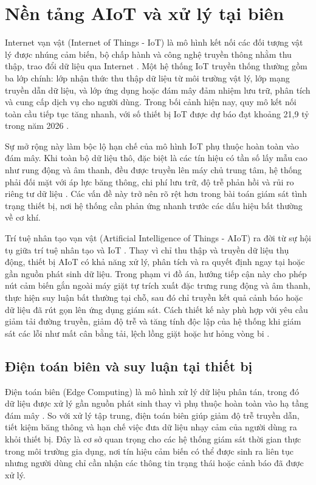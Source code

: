 \section{Nền tảng AIoT và xử lý tại biên}

Internet vạn vật (Internet of Things - IoT) là mô hình kết nối các đối tượng vật lý được nhúng cảm biến, bộ chấp hành và công nghệ truyền thông nhằm thu thập, trao đổi dữ liệu qua Internet . Một hệ thống IoT truyền thống thường gồm ba lớp chính: lớp nhận thức thu thập dữ liệu từ môi trường vật lý, lớp mạng truyền dẫn dữ liệu, và lớp ứng dụng hoặc đám mây đảm nhiệm lưu trữ, phân tích và cung cấp dịch vụ cho người dùng. Trong bối cảnh hiện nay, quy mô kết nối toàn cầu tiếp tục tăng nhanh, với số thiết bị IoT được dự báo đạt khoảng 21,9 tỷ trong năm 2026 .

Sự mở rộng này làm bộc lộ hạn chế của mô hình IoT phụ thuộc hoàn toàn vào đám mây. Khi toàn bộ dữ liệu thô, đặc biệt là các tín hiệu có tần số lấy mẫu cao như rung động và âm thanh, đều được truyền lên máy chủ trung tâm, hệ thống phải đối mặt với áp lực băng thông, chi phí lưu trữ, độ trễ phản hồi và rủi ro riêng tư dữ liệu \cite{ref_1_4}. Các vấn đề này trở nên rõ rệt hơn trong bài toán giám sát tình trạng thiết bị, nơi hệ thống cần phản ứng nhanh trước các dấu hiệu bất thường về cơ khí.

Trí tuệ nhân tạo vạn vật (Artificial Intelligence of Things - AIoT) ra đời từ sự hội tụ giữa trí tuệ nhân tạo và IoT . Thay vì chỉ thu thập và truyền dữ liệu thụ động, thiết bị AIoT có khả năng xử lý, phân tích và ra quyết định ngay tại hoặc gần nguồn phát sinh dữ liệu. Trong phạm vi đồ án, hướng tiếp cận này cho phép nút cảm biến gắn ngoài máy giặt tự trích xuất đặc trưng rung động và âm thanh, thực hiện suy luận bất thường tại chỗ, sau đó chỉ truyền kết quả cảnh báo hoặc dữ liệu đã rút gọn lên ứng dụng giám sát. Cách thiết kế này phù hợp với yêu cầu giảm tải đường truyền, giảm độ trễ và tăng tính độc lập của hệ thống khi giám sát các lỗi như mất cân bằng tải, lệch lồng giặt hoặc hư hỏng vòng bi \cite{ref_1_3}.

\subsection{Điện toán biên và suy luận tại thiết bị}

Điện toán biên (Edge Computing) là mô hình xử lý dữ liệu phân tán, trong đó dữ liệu được xử lý gần nguồn phát sinh thay vì phụ thuộc hoàn toàn vào hạ tầng đám mây \cite{ref_1_4}. So với xử lý tập trung, điện toán biên giúp giảm độ trễ truyền dẫn, tiết kiệm băng thông và hạn chế việc đưa dữ liệu nhạy cảm của người dùng ra khỏi thiết bị. Đây là cơ sở quan trọng cho các hệ thống giám sát thời gian thực trong môi trường gia dụng, nơi tín hiệu cảm biến có thể được sinh ra liên tục nhưng người dùng chỉ cần nhận các thông tin trạng thái hoặc cảnh báo đã được xử lý.

